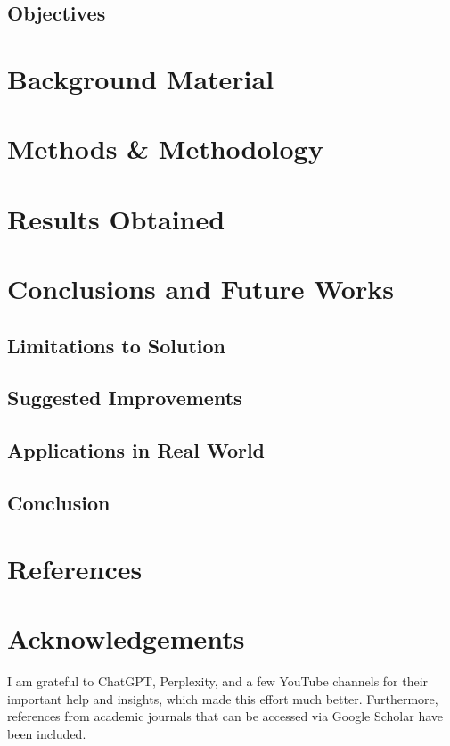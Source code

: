 \documentclass[runningheads]{llncs}
\begin{document}
\subsection{Objectives}

\section{Background Material}

\section{Methods \& Methodology}

\section{Results Obtained}

\section{Conclusions and Future Works}

\subsection{Limitations to Solution}

\subsection{Suggested Improvements}

\subsection{Applications in Real World}

\subsection{Conclusion}


\section{References}



\section{Acknowledgements}
I am grateful to ChatGPT, Perplexity, and a few YouTube channels for their important help and insights, which made this effort much better. Furthermore, references from academic journals that can be accessed via Google Scholar have been included.
\end{document}
